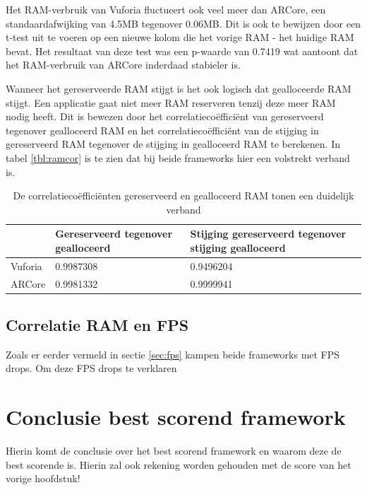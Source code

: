 Het RAM-verbruik van Vuforia fluctueert ook veel meer dan ARCore, een standaardafwijking van 4.5MB tegenover 0.06MB. Dit is ook te bewijzen door een t-test uit te voeren op een nieuwe kolom die het vorige RAM - het huidige RAM bevat. Het resultaat van deze test was een p-waarde van 0.7419 wat aantoont dat het RAM-verbruik van ARCore inderdaad stabieler is.

Wanneer het gereserveerde RAM stijgt is het ook logisch dat gealloceerde RAM stijgt. Een applicatie gaat niet meer RAM reserveren tenzij deze meer RAM nodig heeft. Dit is bewezen door het correlatiecoëfficiënt van gereserveerd tegenover gealloceerd RAM en het correlatiecoëfficiënt van de stijging in gereserveerd RAM tegenover de stijging in gealloceerd RAM te berekenen. In tabel \ref{tbl:ramcor} is te zien dat bij beide frameworks hier een volstrekt verband is.

\begin{table}[]
    \begin{tabular}{@{}l|l|l@{}}
        & Gereserveerd tegenover gealloceerd & Stijging gereserveerd tegenover stijging gealloceerd \\ \midrule
        Vuforia & 0.9987308                          & 0.9496204                                            \\
        ARCore  & 0.9981332                          & 0.9999941                                           
    \end{tabular}
 \caption{De correlatiecoëfficiënten gereserveerd en gealloceerd RAM tonen een duidelijk verband}
\end{table}

\subsection{Correlatie RAM en FPS}
Zoals er eerder vermeld in sectie \ref{sec:fps} kampen beide frameworks met FPS drops. Om deze FPS drops te verklaren 


\section{Conclusie best scorend framework}
Hierin komt de conclusie over het best scorend framework en waarom deze de best scorende is. Hierin zal ook rekening worden gehouden met de score van het vorige hoofdstuk!
